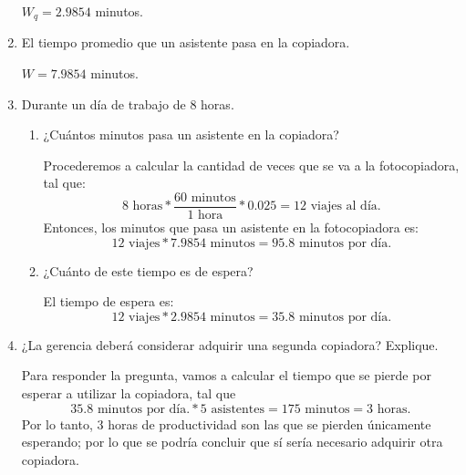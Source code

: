 \begin{problema}
\begin{enumerate}
\begin{sol}
			$W_q=2.9854$ minutos. 
		\end{sol}
		\item El tiempo promedio que un asistente pasa en la copiadora.
		\begin{sol}
			$W=7.9854$ minutos.
		\end{sol}
		\item Durante un día de trabajo de 8 horas.
		\begin{enumerate}
			\item ¿Cuántos minutos pasa un asistente en la copiadora? 
			\begin{sol}
				Procederemos a calcular la cantidad de veces que se va a la fotocopiadora, tal que: 
				$$8 \text{ horas} * \frac{60 \text{ minutos} }{1 \text{ hora} }* 0.025=12 \text{ viajes al día.}$$
				Entonces, los minutos que pasa un asistente en la fotocopiadora es: 
				$$12 \text{ viajes} * 7.9854\text{ minutos}= 95.8 \text{ minutos por día.}$$
			\end{sol}
			\item ¿Cuánto de este tiempo es de espera?
			\begin{sol}
				El tiempo de espera es: 
				$$12 \text{ viajes} * 2.9854\text{ minutos}= 35.8 \text{ minutos por día.}$$
			\end{sol}
		\end{enumerate}
		
		\item ¿La gerencia deberá considerar adquirir una segunda copiadora? Explique.
		\begin{sol}
			Para responder la pregunta, vamos a calcular el tiempo que se pierde por esperar a utilizar la copiadora, tal que 
			$$35.8 \text{ minutos por día.}*5 \text { asistentes} =175 \text{ minutos} = 3 \text{ horas}.$$
			Por lo tanto, 3 horas de productividad son las que se pierden únicamente esperando; por lo que se podría concluir que sí sería necesario adquirir otra copiadora. 
		\end{sol}
	\end{enumerate}
	
	
\end{problema}

%
%

